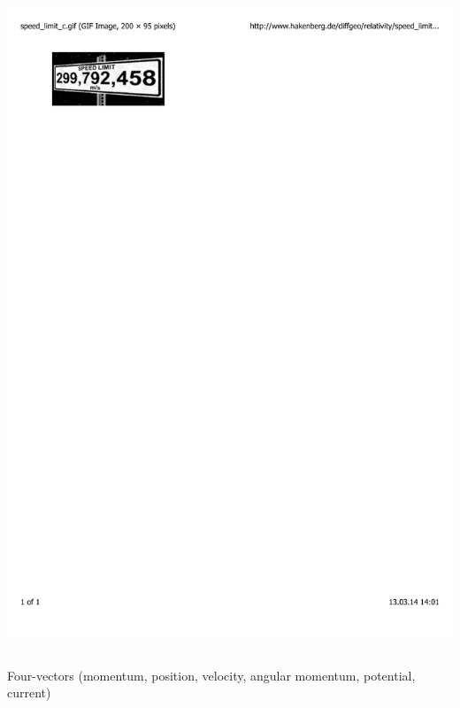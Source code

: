 \documentclass[mathserif,10pt]{beamer}
\begin{document}
\begin{frame}
\begin{columns}
\begin{column}{.50\textwidth}
	\ \\
	\ \\
	\ \\
	\includegraphics[viewport = 60 710 210 780, clip, scale=0.5]{figures/speed_limit.pdf}
    \end{column}
    \end{columns}
    Four-vectors (momentum, position, velocity, angular momentum, potential, current)
\end{frame}
\end{document}
